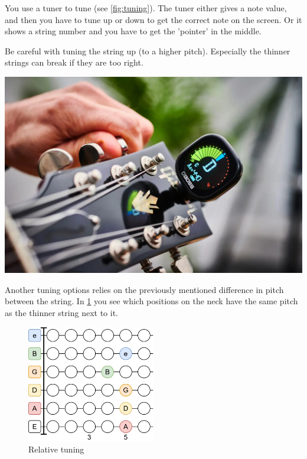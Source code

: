 \begin{minipage}{0.5\textwidth}
You use a tuner to tune (see \ref{fig:tuning}). The tuner either gives a note value, and then you have to tune up or down to get the correct note on the screen. Or it shows a string number and you have to get the 'pointer' in the middle.

Be careful with tuning the string up (to a higher pitch). Especially the thinner strings can break if they are too right.
\end{minipage}
\hfill
\begin{minipage}{0.34\textwidth}
    \centering
    \includegraphics[width=\textwidth]{../Images/guitar-tuning.jpg}
    \label{fig:tuning}
\end{minipage}

Another tuning options relies on the previously mentioned difference in pitch between the string. In \ref{fig:guitar_relative_tuning} you see which positions on the neck have the same pitch as the thinner string next to it.

\begin{figure}[h]
    \centering
    \includegraphics[width=0.5\textwidth]{../Images/GuitarRelativeTuning.png}
    \caption{Relative tuning}
    \label{fig:guitar_relative_tuning}
\end{figure}
